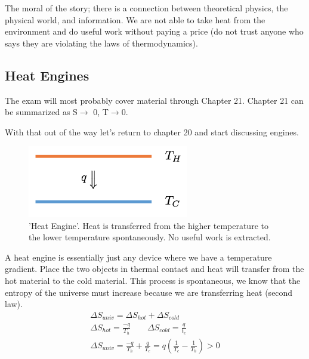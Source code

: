 \documentclass{article}
\begin{document}
The moral of the story; there is a connection between theoretical physics, the physical world, and information. 
We are not able to take heat from the environment and do useful work without paying a price (do not trust anyone who says they are violating the laws of thermodynamics).

\subsection*{Heat Engines}
The exam will most probably cover material through Chapter 21. 
Chapter 21 can be summarized as S$\rightarrow$ 0, T$\rightarrow$0. 

With that out of the way let's return to chapter 20 and start discussing engines.

\begin{figure}[! h]
    \centering
    \includegraphics[width=7cm]{thermal.png}
    \caption{'Heat Engine'. Heat is transferred from the higher temperature to the lower temperature spontaneously. No useful work is extracted.}
    \label{fig:thermal}
\end{figure}

A heat engine is essentially just any device where we have a temperature gradient. 
Place the two objects in thermal contact and heat will transfer from the hot material to the cold material. 
This process is spontaneous, we know that the entropy of the universe must increase because we are transferring heat (second law). 
\begin{equation}
\begin{split}
\Delta S_{univ} = \Delta S_{hot} + \Delta S_{cold}\\
\Delta S_{hot}= \frac{-q}{T_h} \qquad \Delta S_{cold} = \frac{q}{t_c} \\
\Delta S_{univ} = \frac{-q}{T_h} + \frac{q}{T_c} = q\left(\frac{1}{T_c} - \frac{1}{T_h} \right) > 0
\end{split}
\end{equation}
\end{document}
